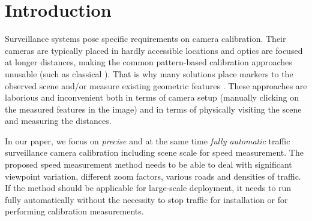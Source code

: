 \documentclass[]{elsarticle}
\begin{document}
\section{Introduction}

Surveillance systems pose specific requirements on camera calibration.  Their cameras are typically placed in hardly accessible locations and optics are focused at longer distances, making the common pattern-based calibration approaches unusable (such as classical \cite{Zhang2000}). That is why many solutions place markers to the observed scene and/or measure existing geometric features \citep{Sina2013,Do2015,You2016,Luvizon2016}.  These approaches are laborious and inconvenient both in terms of camera setup (manually clicking on the measured features in the image) and in terms of physically visiting the scene and measuring the distances.

In our paper, we focus on \emph{precise} and at the same time \emph{fully automatic} traffic surveillance camera calibration including scene scale for speed measurement. The proposed speed measurement method needs to be able to deal with significant viewpoint variation, different zoom factors, various roads and densities of traffic. If the method should be applicable for large-scale deployment, it needs to run fully automatically without the necessity to stop traffic for installation or for performing calibration measurements.
\end{document}
